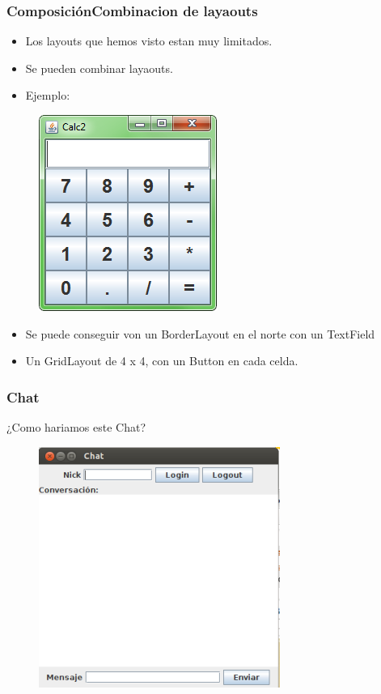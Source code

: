 \documentclass{beamer}
\begin{document}
\begin{frame}
    \frametitle{ComposiciónCombinacion de layaouts}
\begin{itemize}[<+->]
\item Los layouts que hemos visto estan muy limitados.
\item Se pueden combinar layaouts. 
\item Ejemplo:
\end{itemize}
\pause
\begin{figure}
\includegraphics[scale=0.5]{imagenes/calculadora.png}
\end{figure}
\pause
\begin{itemize}[<+->]
\item Se puede conseguir von un BorderLayout en el norte con un TextField
\item Un GridLayout de 4 x 4, con un Button en cada celda.
\end{itemize}
\end{frame}



\begin{frame}[fragile]
\frametitle{Chat}
¿Como hariamos este Chat?
\begin{figure}
\includegraphics[scale=0.7]{imagenes/chat.png}
\end{figure}
\end{frame}
\end{document}

